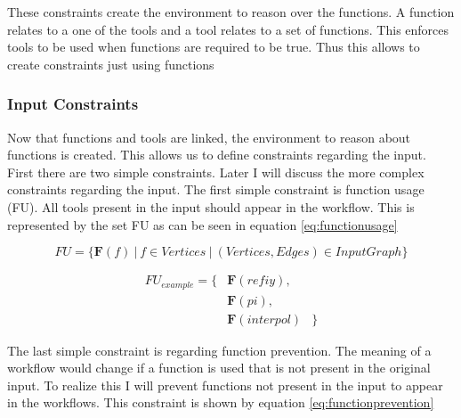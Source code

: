 \documentclass{article}
\begin{document}
These constraints create the environment to reason over the functions. A function relates to a one of the tools and a tool relates to a set of functions. This enforces tools to be used when functions are required to be true. Thus this allows to create constraints just using functions

\subsubsection{Input Constraints}


Now that functions and tools are linked, the environment to reason about functions is created. This allows us to define constraints regarding the input. First there are two simple constraints. Later I will discuss the more complex constraints regarding the input. The first simple constraint is function usage (FU). All tools present in the input should appear in the workflow. This is represented by the set FU as can be seen in equation \ref{eq:functionusage}


\begin{equation}
    FU = \{ \textbf{F}(f)\ |\ f \in Vertices\ |\ (Vertices,Edges) \in InputGraph \}
    \label{eq:functionusage}
\end{equation}

\begin{align*}
    FU_{example}=\{& \textbf{F}(refiy), \\
    &\textbf{F}(pi), \\
    & \textbf{F}(interpol)& \}
\end{align*}

The last simple constraint is regarding function prevention. The meaning of a workflow would change if a function is used that is not present in the original input. To realize this I will prevent functions not present in the input to appear in the workflows. This constraint is shown by equation \ref{eq:functionprevention}
\end{document}
